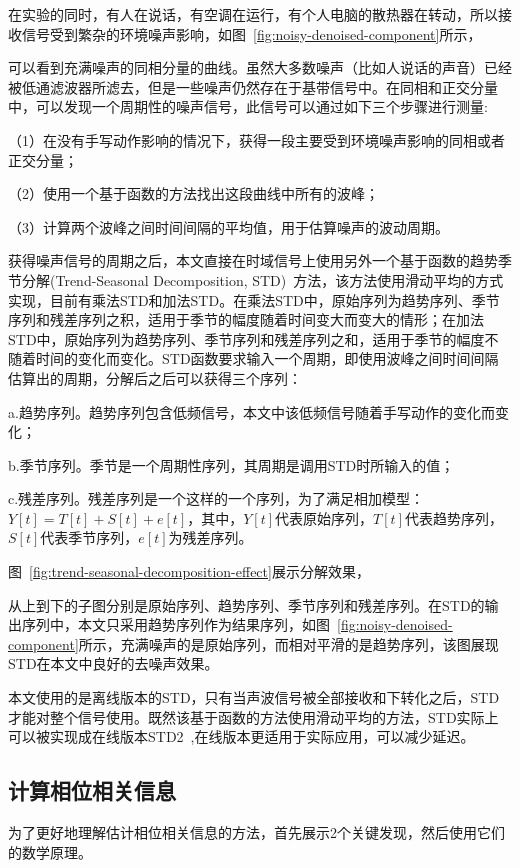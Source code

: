 在实验的同时，有人在说话，有空调在运行，有个人电脑的散热器在转动，所以接收信号受到繁杂的环境噪声影响，如图~\ref{fig:noisy-denoised-component}所示，

可以看到充满噪声的同相分量的曲线。虽然大多数噪声（比如人说话的声音）已经被低通滤波器所滤去，但是一些噪声仍然存在于基带信号中。在同相和正交分量中，可以发现一个周期性的噪声信号，此信号可以通过如下三个步骤进行测量:

（1）在没有手写动作影响的情况下，获得一段主要受到环境噪声影响的同相或者正交分量；

（2）使用一个基于函数的方法找出这段曲线中所有的波峰；

（3）计算两个波峰之间时间间隔的平均值，用于估算噪声的波动周期。

获得噪声信号的周期之后，本文直接在时域信号上使用另外一个基于函数的趋势季节分解(Trend-Seasonal Decomposition, STD)~\cite{cleveland1990stl}方法，该方法使用滑动平均的方式实现，目前有乘法STD和加法STD。在乘法STD中，原始序列为趋势序列、季节序列和残差序列之积，适用于季节的幅度随着时间变大而变大的情形；在加法STD中，原始序列为趋势序列、季节序列和残差序列之和，适用于季节的幅度不随着时间的变化而变化。STD函数要求输入一个周期，即使用波峰之间时间间隔估算出的周期，分解后之后可以获得三个序列：

a.趋势序列。趋势序列包含低频信号，本文中该低频信号随着手写动作的变化而变化；

b.季节序列。季节是一个周期性序列，其周期是调用STD时所输入的值；

c.残差序列。残差序列是一个这样的一个序列，为了满足相加模型：$Y[t] = T[t] + S[t] + e[t]$，其中，$Y[t]$代表原始序列，$T[t]$代表趋势序列，$S[t]$代表季节序列，$e[t]$为残差序列。

图~\ref{fig:trend-seasonal-decomposition-effect}展示分解效果，

从上到下的子图分别是原始序列、趋势序列、季节序列和残差序列。在STD的输出序列中，本文只采用趋势序列作为结果序列，如图~\ref{fig:noisy-denoised-component}所示，充满噪声的是原始序列，而相对平滑的是趋势序列，该图展现STD在本文中良好的去噪声效果。

本文使用的是离线版本的STD，只有当声波信号被全部接收和下转化之后，STD才能对整个信号使用。既然该基于函数的方法使用滑动平均的方法，STD实际上可以被实现成在线版本STD2~\cite{std2},在线版本更适用于实际应用，可以减少延迟。

\subsection{计算相位相关信息}
为了更好地理解估计相位相关信息的方法，首先展示2个关键发现，然后使用它们的数学原理。

